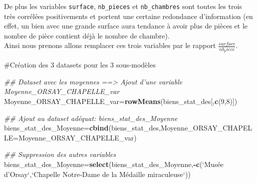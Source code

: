 \documentclass[french,]{article}
\newenvironment{Shaded}{\begin{snugshade}}{\end{snugshade}}
\newcommand{\CommentTok}[1]{\textcolor[rgb]{0.56,0.35,0.01}{\textit{#1}}}
\newcommand{\DataTypeTok}[1]{\textcolor[rgb]{0.13,0.29,0.53}{#1}}
\newcommand{\DecValTok}[1]{\textcolor[rgb]{0.00,0.00,0.81}{#1}}
\newcommand{\KeywordTok}[1]{\textcolor[rgb]{0.13,0.29,0.53}{\textbf{#1}}}
\newcommand{\NormalTok}[1]{#1}
\newcommand{\OperatorTok}[1]{\textcolor[rgb]{0.81,0.36,0.00}{\textbf{#1}}}
\newcommand{\StringTok}[1]{\textcolor[rgb]{0.31,0.60,0.02}{#1}}
\begin{document}
De plus les variables \texttt{surface}, \texttt{nb\_pieces} et
\texttt{nb\_chambres} sont toutes les trois très corrélées positivements
et portent une certaine redondance d'information (en effet, un bien avec
une grande surface aura tendance à avoir plus de pièces et le nombre de
pièce contient déjà le nombre de chambre).\\
Ainsi nous prenons allons remplacer ces trois variables par le rapport
\(\frac{surface}{nb_piece}\).

\begin{Shaded}
\end{Shaded}

\#Création des 3 datasets pour les 3 sous-modèles

\begin{Shaded}
\begin{Highlighting}[]
\CommentTok{## Dataset avec les moyennes ==> Ajout d'une variable Moyenne_ORSAY_CHAPELLE_var}
\NormalTok{Moyenne_ORSAY_CHAPELLE_var=}\KeywordTok{rowMeans}\NormalTok{(biens_stat_des[,}\KeywordTok{c}\NormalTok{(}\DecValTok{9}\NormalTok{,}\DecValTok{8}\NormalTok{)])}

\CommentTok{## Ajout au dataset adéquat: biens_stat_des_Moyenne}
\NormalTok{biens_stat_des_Moyenne=}\KeywordTok{cbind}\NormalTok{(biens_stat_des,}\DataTypeTok{Moyenne_ORSAY_CHAPELLE=}\NormalTok{Moyenne_ORSAY_CHAPELLE_var)}

\CommentTok{## Suppression des autres variables }
\NormalTok{biens_stat_des_Moyenne=}\KeywordTok{select}\NormalTok{(biens_stat_des_Moyenne,}\OperatorTok{-}\KeywordTok{c}\NormalTok{(}\StringTok{`}\DataTypeTok{Musée d’Orsay}\StringTok{`}\NormalTok{,}\StringTok{`}\DataTypeTok{Chapelle Notre-Dame de la Médaille miraculeuse}\StringTok{`}\NormalTok{))}
\end{Highlighting}
\end{Shaded}
\end{document}

